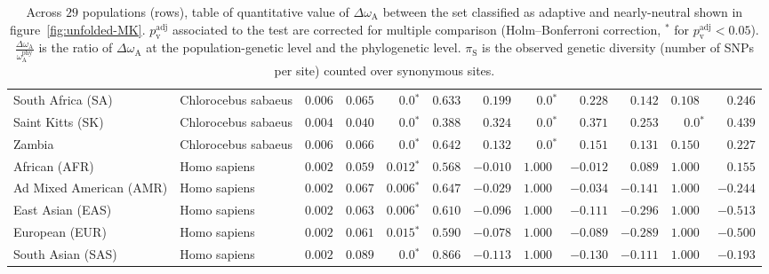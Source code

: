 \documentclass{article}
\newcommand{\rateApop}{\omega_{\mathrm{A}}}
\newcommand{\rateAphy}{\rateApop^{\mathrm{phy}}}
\begin{document}
\begin{table*}[!ht]
\begin{adjustbox}{width = 1\textwidth}
\begin{tabular}{||l|l|r||r|r|r||r|r|r||r|r|r||}
                \rowcolor{LIGHTGREY} South Africa (SA)              & Chlorocebus sabaeus & $ 0.006$ & $ 0.065$ & $\bm{0.0{^*}}$                  & $ 0.633$                                                                     & $ 0.199$ & $\bm{0.0{^*}}$ & $ 0.228$ & $ 0.142$ & $ 0.108~~$ & $ 0.246$ \\
                \rowcolor{LIGHTGREY} Saint Kitts (SK)               & Chlorocebus sabaeus & $ 0.004$ & $ 0.040$ & $\bm{0.0{^*}}$                  & $ 0.388$                                                                     & $ 0.324$ & $\bm{0.0{^*}}$ & $ 0.371$ & $ 0.253$ & $\bm{0.0{^*}}$ & $ 0.439$ \\
                \rowcolor{LIGHTGREY} Zambia                         & Chlorocebus sabaeus & $ 0.006$ & $ 0.066$ & $\bm{0.0{^*}}$                  & $ 0.642$                                                                     & $ 0.132$                      & $\bm{0.0{^*}}$ & $ 0.151$ & $ 0.131$ & $ 0.150~~$ & $ 0.227$ \\
                African (AFR)                                       & Homo sapiens        & $ 0.002$ & $ 0.059$ & $\bm{ 0.012{^*}}$ & $ 0.568$ & $-0.010$ & $ 1.000~~$ & $-0.012$ & $ 0.089$ & $ 1.000~~$ & $ 0.155$ \\
                Ad Mixed American (AMR)                             & Homo sapiens        & $ 0.002$ & $ 0.067$ & $\bm{ 0.006{^*}}$ & $ 0.647$ & $-0.029$ & $ 1.000~~$ & $-0.034$ & $-0.141$ & $ 1.000~~$ & $-0.244$ \\
                East Asian (EAS)                                    & Homo sapiens        & $ 0.002$ & $ 0.063$ & $\bm{ 0.006{^*}}$ & $ 0.610$ & $-0.096$ & $ 1.000~~$ & $-0.111$ & $-0.296$ & $ 1.000~~$ & $-0.513$ \\
                European (EUR)                                      & Homo sapiens        & $ 0.002$ & $ 0.061$ & $\bm{ 0.015{^*}}$ & $ 0.590$ & $-0.078$ & $ 1.000~~$ & $-0.089$ & $-0.289$ & $ 1.000~~$ & $-0.500$ \\
                South Asian (SAS)                                   & Homo sapiens        & $ 0.002$ & $ 0.089$ & $\bm{0.0{^*}}$    & $ 0.866$ & $-0.113$ & $ 1.000~~$ & $-0.130$ & $-0.111$ & $ 1.000~~$ & $-0.193$ \\
                \bottomrule
            \end{tabular}
        \end{adjustbox}
        \caption{
            Across $29$ populations (rows), table of quantitative value of $\Delta \rateApop$ between the set classified as adaptive and nearly-neutral shown in figure~\ref{fig:unfolded-MK}.
            $p_{\mathrm{v}}^{\mathrm{adj}}$ associated to the test are corrected for multiple comparison (Holm–Bonferroni correction, $^*$ for $p_{\mathrm{v}}^{\mathrm{adj}} < 0.05$).
            $\frac{\Delta\rateApop}{\rateAphy}$ is the ratio of $\Delta \rateApop$ at the population-genetic level and the phylogenetic level.
            $\pi_{\textrm{S}}$ is the observed genetic diversity (number of SNPs per site) counted over synonymous sites.
        }
        \label{table:unfolded-MK}
    \end{table*}
\end{document}
